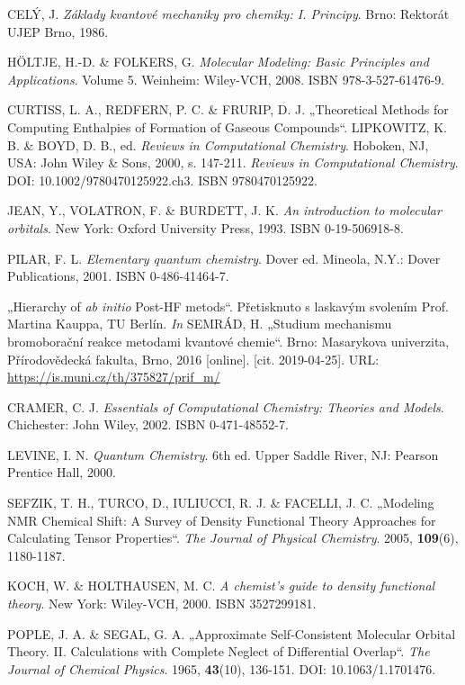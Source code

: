 \begin{thebibliography}{10}

CELÝ, J. \textit{Základy kvantové mechaniky pro chemiky: I. Principy}. Brno: Rektorát UJEP Brno, 1986.

HÖLTJE, H.-D. \& FOLKERS, G. \textit{Molecular Modeling: Basic Principles and Applications}. Volume 5. Weinheim: Wiley-VCH, 2008. ISBN 978-3-527-61476-9.

CURTISS, L. A., REDFERN, P. C. \& FRURIP, D. J. „Theoretical Methods for Computing Enthalpies of Formation of Gaseous Compounds“. LIPKOWITZ, K. B. \& BOYD, D. B., ed. \textit{Reviews in Computational Chemistry}. Hoboken, NJ, USA: John Wiley \& Sons, 2000, s. 147-211. \textit{Reviews in Computational Chemistry}. DOI: 10.1002/9780470125922.ch3. ISBN 9780470125922.

JEAN, Y., VOLATRON, F. \& BURDETT, J. K. \textit{An introduction to molecular orbitals}. New York: Oxford University Press, 1993. ISBN 0-19-506918-8.

PILAR, F. L. \textit{Elementary quantum chemistry}. Dover ed. Mineola, N.Y.: Dover Publications, 2001. ISBN 0-486-41464-7.

„Hierarchy of \textit{ab initio} Post-HF metods“. Přetisknuto s laskavým svolením Prof. Martina Kauppa, TU Berlín. \textit{In} SEMRÁD, H. „Studium mechanismu bromoborační reakce metodami kvantové chemie“. Brno: Masarykova univerzita, Přírodovědecká fakulta, Brno, 2016 [online]. [cit. 2019-04-25]. URL: \url{https://is.muni.cz/th/375827/prif_m/}

CRAMER, C. J. \textit{Essentials of Computational Chemistry: Theories and Models}. Chichester: John Wiley, 2002. ISBN 0-471-48552-7.

LEVINE, I. N. \textit{Quantum Chemistry}. 6th ed. Upper Saddle River, NJ: Pearson Prentice Hall, 2000. 

SEFZIK, T. H., TURCO, D., IULIUCCI, R. J. \& FACELLI, J. C. „Modeling NMR Chemical Shift: A Survey of Density Functional Theory Approaches for Calculating Tensor Properties“. \textit{The Journal of Physical Chemistry}. 2005, \textbf{109}(6), 1180-1187.

KOCH, W. \& HOLTHAUSEN, M. C. \textit{A chemist's guide to density functional theory}. New York: Wiley-VCH, 2000. ISBN 3527299181.

POPLE, J. A. \& SEGAL, G. A. „Approximate Self‐Consistent Molecular Orbital Theory. II. Calculations with Complete Neglect of Differential Overlap“. \textit{The Journal of Chemical Physics}. 1965, \textbf{43}(10), 136-151. DOI: 10.1063/1.1701476.


\end{thebibliography}

